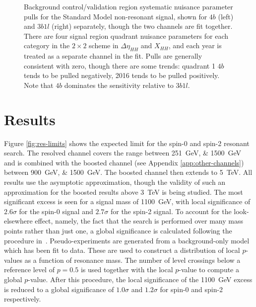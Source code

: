 \begin{figure}[ht]
  \caption{\label{fig:nonres-pull} Background control/validation region systematic nuisance parameter pulls for 
  the Standard Model non-resonant signal, shown for $4b$ (left) and $3b1l$ (right) separately, though the two channels 
  are fit together. There are four signal region quadrant nuisance parameters for each category in the $2\times 2$ scheme 
  in $\Delta \eta_{HH}$ and $X_{HH}$, and each year is treated as a separate channel in the fit. Pulls are generally 
  consistent with zero, though there are some trends: quadrant 1 $4b$ tends to be pulled negatively, 2016 tends to 
  be pulled positively. Note that $4b$ dominates the sensitivity relative to $3b1l$.}
\end{figure}


\FloatBarrier
\clearpage
\section{Results}
Figure \ref{fig:res-limits} shows the expected limit for the spin-0 and spin-2 resonant search. The 
resolved channel covers the range between \SIlist{251;1500}{\GeV} and is combined with the boosted channel (see Appendix \ref{app:other-channels}) between 
\SIlist{900;1500}{\GeV}. The boosted channel then extends to \SI{5}{\TeV}. All results use the asymptotic approximation, 
though the validity of such an approximation for the boosted results above \SI{3}{\TeV} is being studied. 
The most significant excess is seen for a signal mass of \SI{1100}{\GeV}, with local significance of 
$2.6\sigma$ for the spin-0 signal and 
$2.7\sigma$ for the spin-2 signal. To account for the look-elsewhere effect, namely, the fact that the search is 
performed over many mass points rather than just one, a global significance is calculated following the procedure 
in~\cite{LookElsewhereEffect}. Pseudo-experiments are generated from a background-only model which has been fit to 
data. These are used to construct a distribution of local $p$-values as a function of resonance mass. The number of 
level crossings below a reference level of $p=0.5$ is used together with the local $p$-value 
to compute a global $p$-value. After this procedure, the local significance of the \SI{1100}{\GeV} excess is reduced to a global significance of $1.0\sigma$ and $1.2\sigma$ for spin-0 and spin-2 respectively. 

